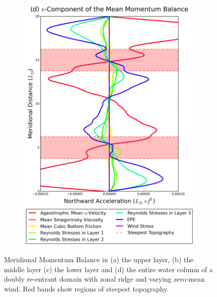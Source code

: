 \documentclass[12pt,a4paper]{report}
\begin{document}
\begin{figure}
\begin{subfigure}{0.46\linewidth}
 		\includegraphics[width=\linewidth ]{vmom_4}
 		\label{fig:vmomtotal}
 	\end{subfigure}
 	\caption{Meridional Momentum Balance in (a) the upper layer, (b) the middle layer
 		(c) the lower layer and (d) the entire water column of 
 		a doubly re-entrant domain with 
 		zonal ridge and varying zero-mean wind. Red bands show regions of steepest topography. }
 	\label{fig:vmom}
 \end{figure}
 
\end{document}

